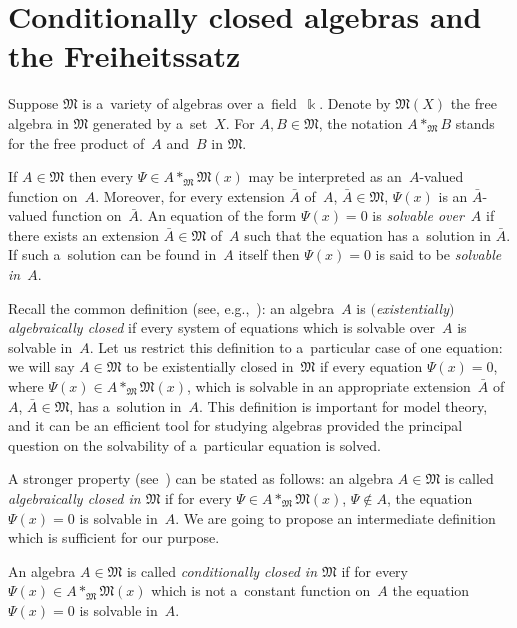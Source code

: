 \documentclass[pdftex]{sigma}
\begin{document}
\section{Conditionally closed algebras and the Freiheitssatz}\label{sec1}

Suppose $\mathfrak M$ is a~variety of algebras over a~f\/ield~$\Bbbk $.
Denote by $\mathfrak M(X)$ the free algebra in $\mathfrak M$ generated by a~set~$X$.
For $A,B\in \mathfrak M$, the notation $A*_{\mathfrak M} B$ stands for the free product of~$A$ and~$B$ in $\mathfrak M$.

If $A\in \mathfrak M$ then every $\Psi \in A*_{\mathfrak M} \mathfrak M(x)$ may be interpreted as an~$A$-valued
function on~$A$.
Moreover, for every extension $\bar A$ of~$A$, $\bar A\in \mathfrak M$, $\Psi(x)$ is an $\bar A$-valued function
on~$\bar A$.
An equation of the form $\Psi(x)=0$ is {\em solvable over}~$A$ if there exists an extension $\bar A\in \mathfrak M$
of~$A$ such that the equation has a~solution in $\bar A$.
If such a~solution can be found in~$A$ itself then $\Psi(x)=0$ is said to be {\em solvable in}~$A$.

Recall the common def\/inition (see, e.g.,~\cite{Higman, Scott}): an algebra~$A$ is {\em $($existentially$)$ algebraically
closed\/} if every system of equations which is solvable over~$A$ is solvable in~$A$.
Let us restrict this def\/inition to a~particular case of one equation: we will say $A\in \mathfrak M$ to be existentially
closed in~$\mathfrak M$ if every equation $\Psi(x)=0$, where $\Psi(x)\in A*_{\mathfrak M} \mathfrak M(x)$, which is solvable in an
appropriate extension~$\bar A$ of~$A$, $\bar A\in \mathfrak M$, has a~solution in~$A$.
This def\/inition is important for model theory, and it can be an ef\/f\/icient tool for studying algebras provided the
principal question on the solvability of a~particular equation is solved.

A stronger property (see~\cite{Bokut66}) can be stated as follows: an algebra $A\in \mathfrak M$ is called {\em
algebraically closed in $\mathfrak M$} if for every $\Psi \in A*_{\mathfrak M} {\mathfrak M}(x)$, $\Psi\notin A$, the
equation $\Psi(x)=0$ is solvable in~$A$.
We are going to propose an intermediate def\/inition which is suf\/f\/icient for our purpose.

\begin{definition}
An algebra $A\in \mathfrak M$ is called {\em conditionally closed in $\mathfrak M$} if for every $\Psi(x)\in
A*_{\mathfrak M} {\mathfrak M}(x)$ which is not a~constant function on~$A$ the equation $\Psi(x)=0$ is solvable in~$A$.
\end{definition}
\end{document}
